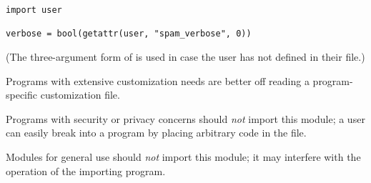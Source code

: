 \begin{verbatim}
import user

verbose = bool(getattr(user, "spam_verbose", 0))
\end{verbatim}

(The three-argument form of  is used in case
the user has not defined  in their
 file.)

Programs with extensive customization needs are better off reading a
program-specific customization file.

Programs with security or privacy concerns should \emph{not} import
this module; a user can easily break into a program by placing
arbitrary code in the  file.

Modules for general use should \emph{not} import this module; it may
interfere with the operation of the importing program.

\begin{seealso}
\end{seealso}
